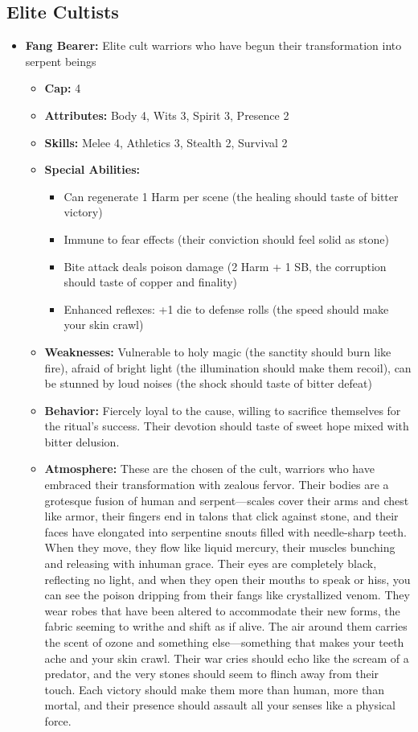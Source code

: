 \documentclass[11pt]{article}
\begin{document}
\begin{itemize}
\subsection{Elite Cultists}
\begin{itemize}
\item \textbf{Fang Bearer:} Elite cult warriors who have begun their transformation into serpent beings
  \begin{itemize}
  \item \textbf{Cap:} 4
  \item \textbf{Attributes:} Body 4, Wits 3, Spirit 3, Presence 2
  \item \textbf{Skills:} Melee 4, Athletics 3, Stealth 2, Survival 2
  \item \textbf{Special Abilities:}
    \begin{itemize}
    \item Can regenerate 1 Harm per scene (the healing should taste of bitter victory)
    \item Immune to fear effects (their conviction should feel solid as stone)
    \item Bite attack deals poison damage (2 Harm + 1 SB, the corruption should taste of copper and finality)
    \item Enhanced reflexes: +1 die to defense rolls (the speed should make your skin crawl)
    \end{itemize}
  \item \textbf{Weaknesses:} Vulnerable to holy magic (the sanctity should burn like fire), afraid of bright light (the illumination should make them recoil), can be stunned by loud noises (the shock should taste of bitter defeat)
  \item \textbf{Behavior:} Fiercely loyal to the cause, willing to sacrifice themselves for the ritual's success. Their devotion should taste of sweet hope mixed with bitter delusion.
  \item \textbf{Atmosphere:} These are the chosen of the cult, warriors who have embraced their transformation with zealous fervor. Their bodies are a grotesque fusion of human and serpent—scales cover their arms and chest like armor, their fingers end in talons that click against stone, and their faces have elongated into serpentine snouts filled with needle-sharp teeth. When they move, they flow like liquid mercury, their muscles bunching and releasing with inhuman grace. Their eyes are completely black, reflecting no light, and when they open their mouths to speak or hiss, you can see the poison dripping from their fangs like crystallized venom. They wear robes that have been altered to accommodate their new forms, the fabric seeming to writhe and shift as if alive. The air around them carries the scent of ozone and something else—something that makes your teeth ache and your skin crawl. Their war cries should echo like the scream of a predator, and the very stones should seem to flinch away from their touch. Each victory should make them more than human, more than mortal, and their presence should assault all your senses like a physical force.
  \end{itemize}
\end{itemize}


\end{itemize}
\end{document}
